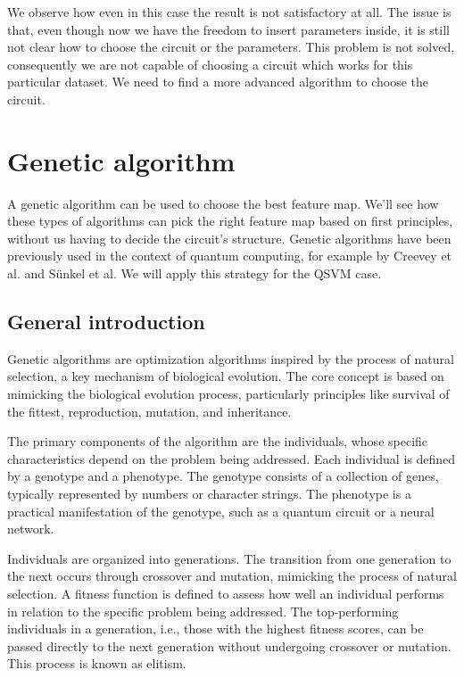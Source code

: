 \documentclass[12pt]{article}
\begin{document}
We observe how even in this case the result is not satisfactory at all. The issue is that, even though now we have the freedom to insert parameters inside, it is still not clear how to choose the circuit or the parameters. This problem is not solved, consequently we are not capable of choosing a circuit which works for this particular dataset. We need to find a more advanced algorithm to choose the circuit.



\newpage
\section{Genetic algorithm}

A genetic algorithm can be used to choose the best feature map. We'll see how these types of algorithms can pick the right feature map based on first principles, without us having to decide the circuit's structure. Genetic algorithms have been previously used in the context of quantum computing, for example by Creevey et al. and Sünkel et al. We will apply this strategy for the QSVM case. 

\subsection{General introduction}

Genetic algorithms are optimization algorithms inspired by the process of natural selection, a key mechanism of biological evolution. The core concept is based on mimicking the biological evolution process, particularly principles like survival of the fittest, reproduction, mutation, and inheritance.

The primary components of the algorithm are the individuals, whose specific characteristics depend on the problem being addressed. Each individual is defined by a genotype and a phenotype. The genotype consists of a collection of genes, typically represented by numbers or character strings. The phenotype is a practical manifestation of the genotype, such as a quantum circuit or a neural network.

Individuals are organized into generations. The transition from one generation to the next occurs through crossover and mutation, mimicking the process of natural selection. A fitness function is defined to assess how well an individual performs in relation to the specific problem being addressed. The top-performing individuals in a generation, i.e., those with the highest fitness scores, can be passed directly to the next generation without undergoing crossover or mutation. This process is known as elitism.
\end{document}
